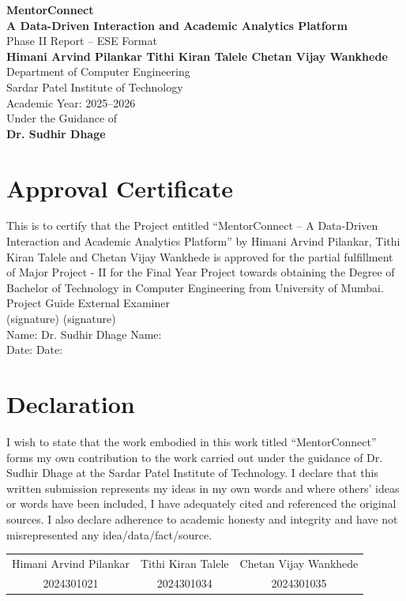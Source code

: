 \documentclass[12pt,singleside,a4paper]{article}
\begin{document}

\begin{center}
  {\LARGE \textbf{MentorConnect\\ A Data-Driven Interaction and Academic Analytics Platform}}\\[1cm]
  {\large Phase II Report -- ESE Format}\\[1cm]
  \textbf{Himani Arvind Pilankar \quad Tithi Kiran Talele \quad Chetan Vijay Wankhede}\\[0.5cm]
  Department of Computer Engineering\\
  Sardar Patel Institute of Technology\\[0.5cm]
  Academic Year: 2025--2026\\[1cm]
  Under the Guidance of\\[0.25cm]
  \textbf{Dr. Sudhir Dhage}\\[2cm]
\end{center}
\newpage

\section*{Approval Certificate}
This is to certify that the Project entitled ``MentorConnect -- A Data-Driven Interaction and Academic Analytics Platform'' by Himani Arvind Pilankar, Tithi Kiran Talele and Chetan Vijay Wankhede is approved for the partial fulfillment of Major Project - II for the Final Year Project towards obtaining the Degree of Bachelor of Technology in Computer Engineering from University of Mumbai.
\\[1em]
Project Guide \hfill External Examiner\\
(signature) \hfill (signature)\\[1em]
Name: Dr. Sudhir Dhage \hfill Name: \\
Date: \hfill Date: \\
\vspace{1cm}
\section*{Declaration}
I wish to state that the work embodied in this work titled ``MentorConnect'' forms my own contribution to the work carried out under the guidance of Dr. Sudhir Dhage at the Sardar Patel Institute of Technology. I declare that this written submission represents my ideas in my own words and where others' ideas or words have been included, I have adequately cited and referenced the original sources. I also declare adherence to academic honesty and integrity and have not misrepresented any idea/data/fact/source.
\\[2em]
\begin{tabular}{ccc}
Himani Arvind Pilankar & Tithi Kiran Talele & Chetan Vijay Wankhede\\
2024301021 & 2024301034 & 2024301035
\end{tabular}
\newpage
\end{document}
